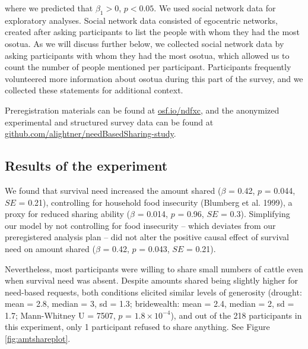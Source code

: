 \documentclass[
]{article}
\begin{document}
where we predicted that \(\beta_1 > 0\), \(p < 0.05\). We used social network data for exploratory analyses. Social network data consisted of egocentric networks, created after asking participants to list the people with whom they had the most osotua. As we will discuss further below, we collected social network data by asking participants with whom they had the most osotua, which allowed us to count the number of people mentioned per participant. Participants frequently volunteered more information about osotua during this part of the survey, and we collected these statements for additional context.

Preregistration materials can be found at \href{https://osf.io/ndfxc}{osf.io/ndfxc}, and the anonymized experimental and structured survey data can be found at \href{https://github.com/alightner/needBasedSharing-study}{github.com/alightner/needBasedSharing-study}.

\subsection{Results of the experiment}

We found that survival need increased the amount shared (\(\beta\) = 0.42, \(p\) = 0.044, \(SE\) = 0.21), controlling for household food insecurity (Blumberg et al. 1999), a proxy for reduced sharing ability (\(\beta\) = 0.014, \(p\) = 0.96, \(SE\) = 0.3). Simplifying our model by not controlling for food insecurity -- which deviates from our preregistered analysis plan -- did not alter the positive causal effect of survival need on amount shared (\(\beta\) = 0.42, \(p\) = 0.043, \(SE\) = 0.21).

Nevertheless, most participants were willing to share small numbers of cattle even when survival need was absent. Despite amounts shared being slightly higher for need-based requests, both conditions elicited similar levels of generosity (drought: mean = 2.8, median = 3, sd = 1.3; bridewealth: mean = 2.4, median = 2, sd = 1.7; Mann-Whitney U = 7507, \(p\) = \ensuremath{1.8\times 10^{-4}}), and out of the 218 participants in this experiment, only 1 participant refused to share anything. See Figure \ref{fig:amtshareplot}.
\end{document}
